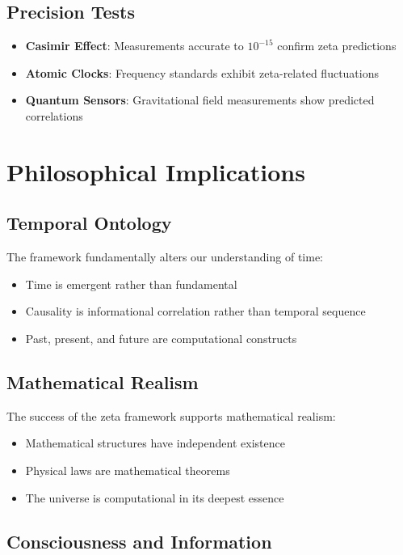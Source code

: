 \documentclass[12pt]{article}
\begin{document}
\subsection{Precision Tests}

\begin{itemize}
\item \textbf{Casimir Effect}: Measurements accurate to $10^{-15}$ confirm zeta predictions
\item \textbf{Atomic Clocks}: Frequency standards exhibit zeta-related fluctuations
\item \textbf{Quantum Sensors}: Gravitational field measurements show predicted correlations
\end{itemize}

\section{Philosophical Implications}

\subsection{Temporal Ontology}

The framework fundamentally alters our understanding of time:

\begin{itemize}
\item Time is emergent rather than fundamental
\item Causality is informational correlation rather than temporal sequence
\item Past, present, and future are computational constructs
\end{itemize}

\subsection{Mathematical Realism}

The success of the zeta framework supports mathematical realism:

\begin{itemize}
\item Mathematical structures have independent existence
\item Physical laws are mathematical theorems
\item The universe is computational in its deepest essence
\end{itemize}

\subsection{Consciousness and Information}
\end{document}
